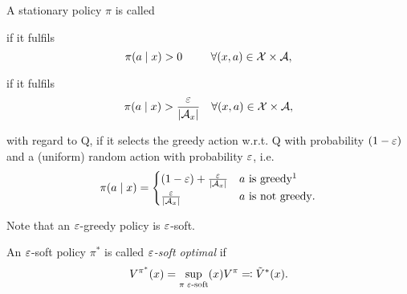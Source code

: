 \begin{definition}
	A stationary policy \(\pi\) is called 
	\begin{description}[font=\normalfont]
		\item[\emph{soft}] if it fulfils 
		\[
			\pi(a\mid x)>0 \qquad\;\; \forall (x,a)\in\mathcal{X}\times\mathcal{A},
		\]
		\item[\emph{\(\vep\)-soft}] if it fulfils 
		\[
			\pi(a\mid x)>\frac{\varepsilon}{|\mathcal{A}_x|} \quad \forall (x,a)\in\mathcal{X}\times\mathcal{A},
		\]
		\item[\emph{\(\vep\)-greedy}] with regard to Q, if it selects the greedy action w.r.t. Q with probability \((1-\varepsilon)\) and a (uniform) random action with probability \(\vep\), i.e. \[\pi(a\mid x)=
			\begin{cases}
				(1-\vep)+ \frac{\vep}{|\cA_x|} & a \text{ is greedy\footnotemark[1]}\\
				\frac{\vep}{|\cA_x|} & a \text{ is not greedy}.
			\end{cases}
		\]
	\end{description}
	Note that an \(\vep\)-greedy policy is \(\vep\)-soft.

	An \(\vep\)-soft policy \(\pi^*\) is called \emph{\(\vep\)-soft optimal} if 
	\[
		V^{\pi^*}(x)=\sup_{\pi\; \varepsilon\text{-soft}}(x) V^\pi \eqqcolon \tilde{V}^*(x).
	\]
\end{definition}

